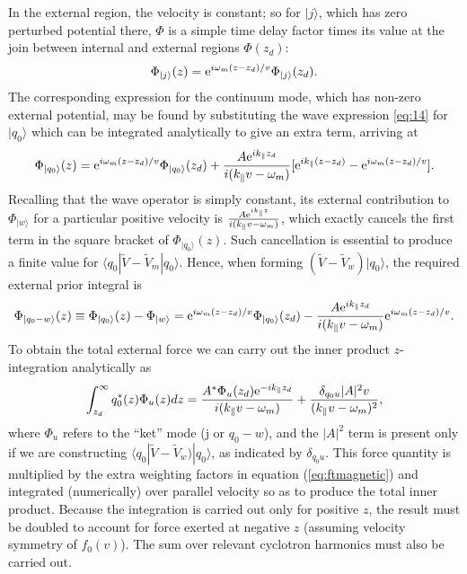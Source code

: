 \documentclass[12pt]{article}
\def\ket#1{|#1\rangle}
\def\bra#1{\langle#1}
\def\etothe#1{{\rm e}^{#1}}
\begin{document}
In the external region, the velocity is constant; so for $\ket{j}$,
which has zero perturbed potential there, $\Phi$ is a simple time
delay factor times its value at the join between internal and external
regions $\Phi(z_d)$:
\begin{equation}
  \label{phi4}
  \Phi_{\ket{j}}(z)=\etothe{i\omega_m(z-z_d)/v}   \Phi_{\ket{j}}(z_d).
\end{equation}
The corresponding expression for the continuum mode, which has
non-zero external potential, may be
found by substituting the wave expression \ref{eq:14} for  $\ket{q_0}$
which can be integrated analytically to give an extra term, arriving
at 
\begin{equation}
  \label{phiq}
  \Phi_{\ket{q_0}}(z)=\etothe{i\omega_m(z-z_d)/v}   \Phi_{\ket{q_0}}(z_d)
  +{A\etothe{ik_\parallel z_d}\over i(k_\parallel v-\omega_m)}[\etothe{ik_\parallel(z-z_d)}
  -\etothe{i\omega_m(z-z_d)/v}].
\end{equation}
Recalling that the wave operator is simply constant, its external
contribution to $\Phi_{\ket{w}}$ for a particular positive velocity is
${A\etothe{ik_\parallel z}\over i(k_\parallel v-\omega_m)}$, which
exactly cancels the first term in the square bracket of
$\Phi_{\ket{q_0}}(z)$. Such cancellation is essential to produce a
finite value for $\bra{q_0}|\tilde V -\tilde V_m\ket{q_0}$. Hence,
when forming
$(\tilde V -\tilde V_w)\ket{q_0}$, the required external prior
integral is
\begin{equation}
  \label{phidiff}
  \Phi_{\ket{q_0-w}}(z)\equiv \Phi_{\ket{q_0}}(z)-\Phi_{\ket{w}}
  =\etothe{i\omega_m(z-z_d)/v}   \Phi_{\ket{q_0}}(z_d)
  -{A\etothe{ik_\parallel z_d}\over i(k_\parallel v-\omega_m)}
  \etothe{i\omega_m(z-z_d)/v}.
\end{equation}
To obtain the total external force we can carry out the inner product
$z$-integration analytically as
\begin{equation}
  \label{extforce}
  \int_{z_d}^\infty q_0^*(z) \Phi_u(z)  dz =
  {A^*\Phi_u(z_d)\etothe{-ik_\parallel z_d}\over i(k_\parallel  v-\omega_m)}
  + {\delta_{q_0u}|A|^2v\over (k_\parallel v-\omega_m)^2},
\end{equation}
where $\Phi_u$ refers to the ``ket'' mode (j or $q_0-w$), and the
$|A|^2$ term is present only if we are constructing
$\bra{q_0}|\tilde V -\tilde V_w)\ket{q_0}$, as indicated by
$\delta_{q_0u}$. This force quantity is multiplied by the extra
weighting factors in equation (\ref{eq:ftmagnetic}) and integrated
(numerically) over parallel velocity so as to produce the total inner
product. Because the integration is carried out only for positive $z$,
the result must be doubled to account for force exerted at negative
$z$ (assuming velocity symmetry of $f_0(v)$). The sum over relevant
cyclotron harmonics must also be carried out.
\end{document}
